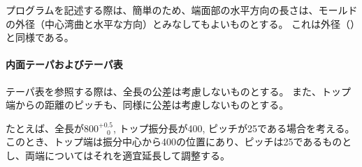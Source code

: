 プログラムを記述する際は、簡単のため、端面部の水平方向の長さは、モールドの外径（中心湾曲と水平な方向）とみなしてもよいものとする。
これは外径（）と同様である。

\paragraph*{内面テーパおよびテーパ表}\noindent
{}テーパ表を参照する際は、全長の公差は考慮しないものとする。
また、トップ端からの距離のピッチも、同様に公差は考慮しないものとする。

たとえば、全長が$800^{+0.5}_{\phantom -0}$, トップ振分長が400, ピッチが25である場合を考える。
このとき、トップ端は振分中心から400の位置にあり、ピッチは25であるものとし、両端についてはそれを適宜延長して調整する。